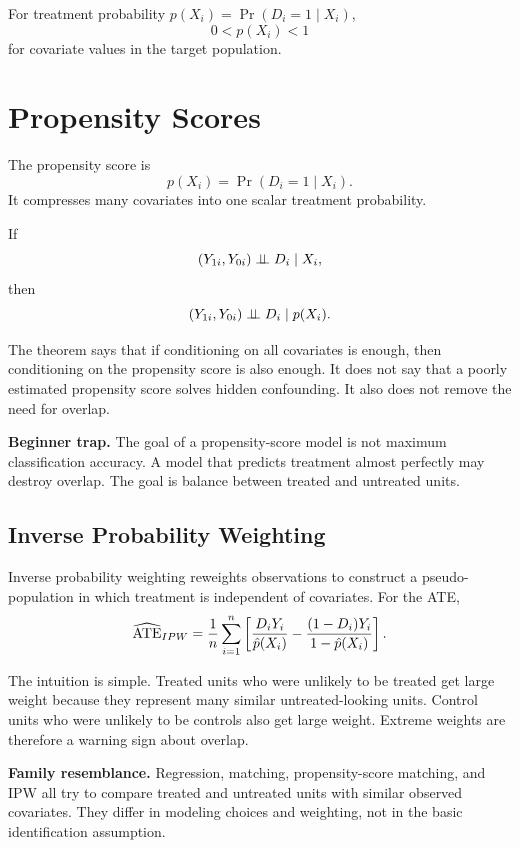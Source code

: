 \begin{assN}[Overlap]
For treatment probability \(p(X_i)=\Pr(D_i=1\mid X_i)\),
\[
    0 < p(X_i) < 1
\]
for covariate values in the target population.
\end{assN}

\section{Propensity Scores}

The propensity score is
\[
    p(X_i)=\Pr(D_i=1\mid X_i).
\]
It compresses many covariates into one scalar treatment probability.

\begin{thmN}
If
\[
    (Y_{1i},Y_{0i})\perp\!\!\!\perp D_i\mid X_i,
\]
then
\[
    (Y_{1i},Y_{0i})\perp\!\!\!\perp D_i\mid p(X_i).
\]
\end{thmN}

The theorem says that if conditioning on all covariates is enough, then
conditioning on the propensity score is also enough. It does not say that a
poorly estimated propensity score solves hidden confounding. It also does not
remove the need for overlap.

\begin{boxF}
\textbf{Beginner trap.} The goal of a propensity-score model is not maximum
classification accuracy. A model that predicts treatment almost perfectly may
destroy overlap. The goal is balance between treated and untreated units.
\end{boxF}

\subsection{Inverse Probability Weighting}

Inverse probability weighting reweights observations to construct a pseudo-
population in which treatment is independent of covariates. For the ATE,
\[
    \widehat{\mathrm{ATE}}_{IPW}
    =
    \frac{1}{n}\sum_{i=1}^n
    \left[
    \frac{D_iY_i}{\hat{p}(X_i)}
    -
    \frac{(1-D_i)Y_i}{1-\hat{p}(X_i)}
    \right].
\]

The intuition is simple. Treated units who were unlikely to be treated get large
weight because they represent many similar untreated-looking units. Control
units who were unlikely to be controls also get large weight. Extreme weights
are therefore a warning sign about overlap.

\begin{boxD}
\textbf{Family resemblance.} Regression, matching, propensity-score matching,
and IPW all try to compare treated and untreated units with similar observed
covariates. They differ in modeling choices and weighting, not in the basic
identification assumption.
\end{boxD}

